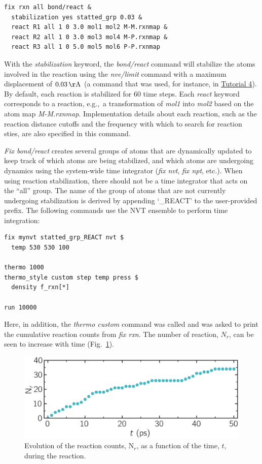 \documentclass[9pt,tutorial]{livecoms}
\begin{document}
{\normalsize
\begin{verbatim}
fix rxn all bond/react &
  stabilization yes statted_grp 0.03 &
  react R1 all 1 0 3.0 mol1 mol2 M-M.rxnmap &
  react R2 all 1 0 3.0 mol3 mol4 M-P.rxnmap &
  react R3 all 1 0 5.0 mol5 mol6 P-P.rxnmap
\end{verbatim}
}
With the \textit{stabilization} keyword, the \textit{bond/react} command will
stabilize the atoms involved in the reaction using the \textit{nve/limit}
command with a maximum displacement of $0.03\,\mathrm{\AA{}}$ (a command that was
used, for instance, in \hyperref[sheared-confined-label]{Tutorial 4}).  By default,
each reaction is stabilized for 60 time steps.  Each \textit{react} keyword
corresponds to a reaction, e.g.,~a transformation of \textit{mol1} into \textit{mol2}
based on the atom map \textit{M-M.rxnmap}.  Implementation details about each reaction,
such as the reaction distance cutoffs and the frequency with which to search for
reaction sties, are also specified in this command.

\textit{Fix bond/react} creates several groups of atoms that are dynamically updated
to keep track of which atoms are being stabilized, and which atoms are undergoing
dynamics using the system-wide time integrator (\textit{fix nvt}, \textit{fix npt}, etc.).
When using reaction stabilization, there should not be a time integrator that acts on
the ``all'' group.  The name of the group of atoms that are not currently undergoing
stabilization is derived by appending `\_REACT' to the user-provided prefix.  The
following commands use the NVT ensemble to perform time integration:
{\normalsize
\begin{verbatim}
fix mynvt statted_grp_REACT nvt $
  temp 530 530 100

thermo 1000
thermo_style custom step temp press $
  density f_rxn[*]

run 10000
\end{verbatim}
}
Here, in addition, the \textit{thermo custom} command was called and was
asked to print the cumulative reaction counts from \textit{fix rxn}.
The number of reaction, $N_r$, can be seen to increase with time
(Fig.~\ref{fig:evolution-reacting}).

\begin{figure}
\centering
\includegraphics[width=\linewidth]{REACT-reacting}
\caption{Evolution of the reaction counts, $\text{N}_r$,
as a function of the time, $t$, during the reaction.}
\label{fig:evolution-reacting}
\end{figure}
\end{document}
